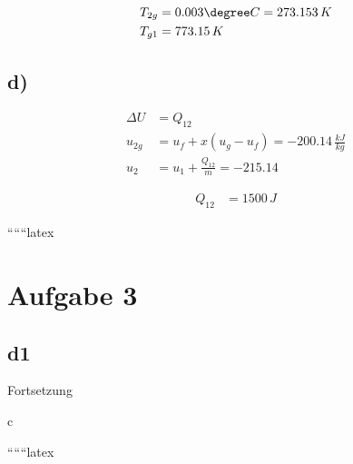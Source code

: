 \begin{align*}
    T_{2g} &= 0.003 \degree C = 273.153 \, K \\
    T_{g1} &= 773.15 \, K
\end{align*}

\subsection*{d)}
\begin{align*}
    \Delta U &= Q_{12} \\
    u_{2g} &= u_{f} + x (u_{g} - u_{f}) = -200.14 \, \frac{kJ}{kg} \\
    u_2 &= u_1 + \frac{Q_{12}}{m} = -215.14
\end{align*}

\begin{align*}
    Q_{12} &= 1500 \, J
\end{align*}

``````latex


\section*{Aufgabe 3}

\subsection*{d1}
Fortsetzung

c

``````latex



